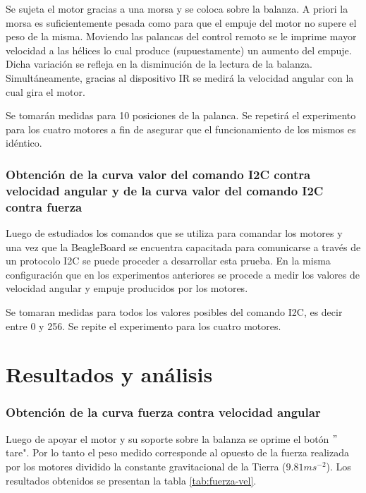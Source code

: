 \documentclass[spanish,12pt,a4paper,titlepage]{report}
\begin{document}
Se sujeta el motor gracias a una morsa y se coloca sobre la balanza. A priori la morsa es suficientemente pesada como para que el empuje del motor no supere el peso de la misma. Moviendo las palancas del control remoto se le imprime mayor velocidad a las hélices lo cual produce (supuestamente) un aumento del empuje. Dicha variación se refleja en la disminución de la lectura de la balanza. 
Simultáneamente, gracias al dispositivo IR se medirá la velocidad angular con la cual gira el motor. 

Se tomarán medidas para 10 posiciones de la palanca.
Se repetirá el experimento para los cuatro motores a fin de asegurar que el funcionamiento de los mismos es idéntico.



\subsubsection*{Obtención de la curva valor del comando I2C contra velocidad angular y de la curva valor del comando I2C contra fuerza}

Luego de estudiados los comandos que se utiliza para comandar los motores y una vez que la BeagleBoard se encuentra capacitada para comunicarse a través de un protocolo I2C se puede proceder a desarrollar esta prueba. En la misma configuración que en los experimentos anteriores se procede a medir los valores de velocidad angular y empuje producidos por los motores. 

Se tomaran medidas para todos los valores posibles del comando I2C, es decir entre 0 y 256.
Se repite el experimento para los cuatro motores.


\section{Resultados y análisis}

\subsubsection{Obtención de la curva fuerza contra velocidad angular}

Luego de apoyar el motor y su soporte sobre la balanza se oprime el botón $"$tare". Por lo tanto el peso medido corresponde al opuesto de la fuerza realizada por los motores dividido la constante gravitacional de la Tierra ($9.81ms^{-2}$). Los resultados obtenidos se presentan la tabla \ref{tab:fuerza-vel}.
\end{document}
